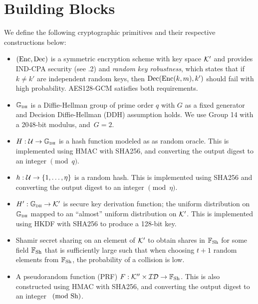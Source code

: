 

\section{Building Blocks} %
\label{sec:building_blocks}

We define the following cryptographic primitives and their respective constructions below:
\begin{itemize}
	\item $\left(\text{Enc}, \text{Dec}\right)$ is a symmetric encryption scheme with  key space $\mathcal{K}'$ and provides IND-CPA security (see \cite{katz2014introduction} .2) and \emph{random key robustness}, which states that if $k \neq k'$ are independent random keys, then $\text{Dec}(\text{Enc}(k,m), k')$ should fail with high probability. AES128-GCM satisfies both requirements.



	\item $\mathbb{G}_{\textsc{dh}}$ is a Diffie-Hellman group of prime order $q$ with $G$ as a fixed generator and Decision Diffie-Hellman (DDH) assumption holds. We use Group 14 with a 2048-bit modulus, and~$G = 2$.

	\item $H : \mathcal{U} \to \mathbb{G}_{\textsc{dh}}$ is a hash function modeled as as random oracle. This is implemented using HMAC with SHA256, and converting the output digest to an integer $\pmod q$.
	\item $h : \mathcal{U} \to \left\{1,\dots,\eta\right\}$ is a random hash. This is implemented using  SHA256 and converting the output digest to an integer $\pmod \eta$.

	\item $H' : \mathbb{G}_{\textsc{dh}} \to \mathcal{K}'$ is secure key derivation function; the uniform distribution on $\mathbb{G}_{\textsc{dh}}$ mapped to an ``almost'' uniform distribution on $\mathcal{K}'$. This is implemented using HKDF with SHA256 to produce a 128-bit key.
	\item Shamir secret sharing on an element of $\mathcal{K}'$ to obtain shares in $\mathbb{F}_{\text{Sh}}$ for some field $\mathbb{F}_{\text{Sh}}$ that is sufficiently large such that when choosing $t+1$ random elements from $\mathbb{F}_{\text{Sh}}$, the probability of a collision is low.

	\item A pseudorandom function (PRF) $F : \mathcal{K}'' \times \mathcal{ID} \to \mathbb{F}_{\text{Sh}}$. This is also  constructed using HMAC with SHA256, and converting the output digest to an integer $\pmod {\text{Sh}}$.
\end{itemize}



